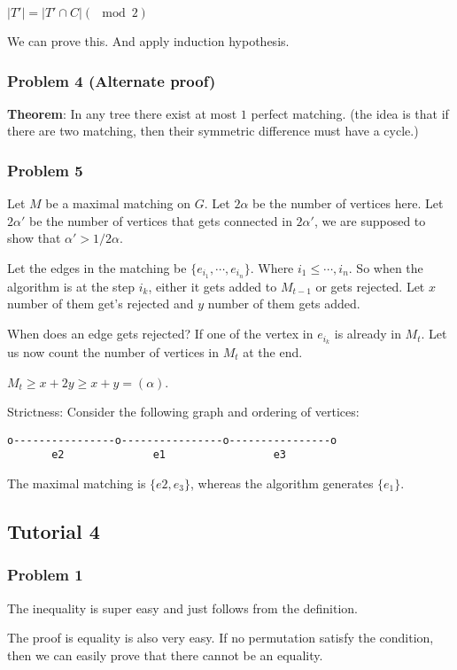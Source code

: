 \documentclass[11pt]{article}
\begin{document}
\(\vert T' \vert = \vert T' \cap C \vert (\mod 2)\)

We can prove this. And apply induction hypothesis.
\subsubsection{Problem 4 (Alternate proof)}
\label{sec:orgbc0e45d}
\textbf{Theorem}: In any tree there exist at most \(1\) perfect matching. (the idea
 is that if there are two matching, then their symmetric difference must
 have a cycle.)
\subsubsection{Problem 5}
\label{sec:orgddb15c0}
Let \(M\) be a maximal matching on \(G\). Let \(2\alpha\) be the number of
vertices here. Let \(2\alpha'\) be the number of vertices that gets connected
in \(2\alpha'\), we are supposed to show that \(\alpha' > 1/2 \alpha\).

Let the edges in the matching be \(\{e_{i_1}, \cdots, e_{i_n}\}\). Where \(i_1
    \le \cdots, i_n\). So when the algorithm is at the step \(i_k\), either it gets
added to \(M_{t-1}\) or gets rejected. Let \(x\) number of them get's rejected
and \(y\) number of them gets added.

When does an edge gets rejected? If one of the vertex in \(e_{i_k}\) is
already in \(M_{t}\). Let us now count the number of vertices in \(M_t\) at the
end.

\(M_t \ge x + 2y \ge x+y = (\alpha)\).

Strictness: Consider the following graph and ordering of vertices:
\begin{verbatim}
o----------------o----------------o----------------o
       e2              e1                 e3       
\end{verbatim}

The maximal matching is \(\{e2, e_3\}\), whereas the algorithm generates
\(\{e_1\}\).
\subsection{Tutorial 4}
\label{sec:org7cfc530}
\subsubsection{Problem 1}
\label{sec:org2ba63be}
The inequality is super easy and just follows from the definition.

The proof is equality is also very easy. If no permutation satisfy the
condition, then we can easily prove that there cannot be an equality.
\end{document}
